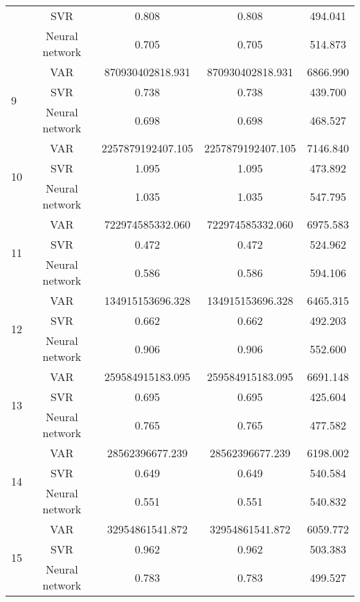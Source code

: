 \documentclass[12pt]{article}
\begin{document}
\begin{longtable}{|p{2cm}|c|c|c|c|}
\cline{2-5}
 &SVR &   0.808 &    0.808 &    494.041\\
\cline{2-5}
 &Neural network &   0.705 &    0.705 &    514.873\\
\cline{2-5}
\hline
\multirow{3}{*}{9} &VAR &   870930402818.931 &    870930402818.931 &    6866.990\\
\cline{2-5}
 &SVR &   0.738 &    0.738 &    439.700\\
\cline{2-5}
 &Neural network &   0.698 &    0.698 &    468.527\\
\cline{2-5}
\hline
\multirow{3}{*}{10} &VAR &   2257879192407.105 &    2257879192407.105 &    7146.840\\
\cline{2-5}
 &SVR &   1.095 &    1.095 &    473.892\\
\cline{2-5}
 &Neural network &   1.035 &    1.035 &    547.795\\
\cline{2-5}
\hline
\multirow{3}{*}{11} &VAR &   722974585332.060 &    722974585332.060 &    6975.583\\
\cline{2-5}
 &SVR &   0.472 &    0.472 &    524.962\\
\cline{2-5}
 &Neural network &   0.586 &    0.586 &    594.106\\
\cline{2-5}
\hline
\multirow{3}{*}{12} &VAR &   134915153696.328 &    134915153696.328 &    6465.315\\
\cline{2-5}
 &SVR &   0.662 &    0.662 &    492.203\\
\cline{2-5}
 &Neural network &   0.906 &    0.906 &    552.600\\
\cline{2-5}
\hline
\multirow{3}{*}{13} &VAR &   259584915183.095 &    259584915183.095 &    6691.148\\
\cline{2-5}
 &SVR &   0.695 &    0.695 &    425.604\\
\cline{2-5}
 &Neural network &   0.765 &    0.765 &    477.582\\
\cline{2-5}
\hline
\multirow{3}{*}{14} &VAR &   28562396677.239 &    28562396677.239 &    6198.002\\
\cline{2-5}
 &SVR &   0.649 &    0.649 &    540.584\\
\cline{2-5}
 &Neural network &   0.551 &    0.551 &    540.832\\
\cline{2-5}
\hline
\multirow{3}{*}{15} &VAR &   32954861541.872 &    32954861541.872 &    6059.772\\
\cline{2-5}
 &SVR &   0.962 &    0.962 &    503.383\\
\cline{2-5}
 &Neural network &   0.783 &    0.783 &    499.527\\
\cline{2-5}

\end{longtable}
\end{document}
